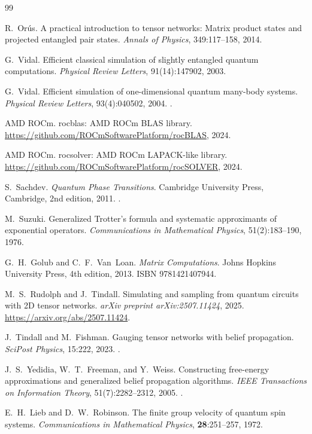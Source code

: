 \documentclass[11pt]{article}
\begin{document}

\begin{thebibliography}{99}

R.~Or\'us.
\newblock A practical introduction to tensor networks: Matrix product states
  and projected entangled pair states.
\newblock \emph{Annals of Physics}, 349:117--158, 2014.

G.~Vidal.
\newblock Efficient classical simulation of slightly entangled quantum
  computations.
\newblock \emph{Physical Review Letters}, 91(14):147902, 2003.

G.~Vidal.
\newblock Efficient simulation of one-dimensional quantum many-body systems.
\newblock \emph{Physical Review Letters}, 93(4):040502, 2004.
\newblock {}.

{AMD ROCm}.
\newblock rocblas: {AMD ROCm BLAS} library.
\newblock \url{https://github.com/ROCmSoftwarePlatform/rocBLAS}, 2024.

{AMD ROCm}.
\newblock rocsolver: {AMD ROCm LAPACK-like} library.
\newblock \url{https://github.com/ROCmSoftwarePlatform/rocSOLVER}, 2024.

S.~Sachdev.
\newblock \emph{Quantum Phase Transitions}.
\newblock Cambridge University Press, Cambridge, 2nd edition, 2011.
\newblock {}.

M.~Suzuki.
\newblock Generalized {Trotter}'s formula and systematic approximants of
  exponential operators.
\newblock \emph{Communications in Mathematical Physics}, 51(2):183--190, 1976.

G.~H.~Golub and C.~F.~Van~Loan.
\newblock \emph{Matrix Computations}.
\newblock Johns Hopkins University Press, 4th edition, 2013.
\newblock ISBN 9781421407944.

M.~S.~Rudolph and J.~Tindall.
\newblock Simulating and sampling from quantum circuits with {2D} tensor
  networks.
\newblock \emph{arXiv preprint arXiv:2507.11424}, 2025.
\newblock \url{https://arxiv.org/abs/2507.11424}.

J.~Tindall and M.~Fishman.
\newblock Gauging tensor networks with belief propagation.
\newblock \emph{SciPost Physics}, 15:222, 2023.
\newblock {}.

J.~S.~Yedidia, W.~T.~Freeman, and Y.~Weiss.
\newblock Constructing free-energy approximations and generalized belief
  propagation algorithms.
\newblock \emph{IEEE Transactions on Information Theory}, 51(7):2282--2312,
  2005.
\newblock {}.

E.~H.~Lieb and D.~W.~Robinson.
\newblock The finite group velocity of quantum spin systems.
\newblock \emph{Communications in Mathematical Physics}, \textbf{28}:251--257,
  1972.

\end{thebibliography}
\end{document}
